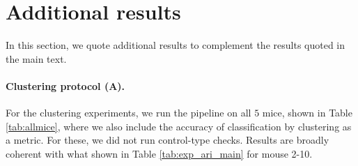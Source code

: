 \documentclass[11pt]{article}
\begin{document}
\section{Additional results}\label{app:results}

In this section, we quote additional results to complement the results quoted in the main text. 

\paragraph{Clustering protocol (A).} For the clustering experiments, we run the pipeline on all $5$ mice, shown in Table \ref{tab:allmice}, where we also include the accuracy of classification by clustering as a metric. For these, we did not run control-type checks. Results are broadly coherent with what shown in Table \ref{tab:exp_ari_main} for mouse \textsc{2-10}.
\end{document}
